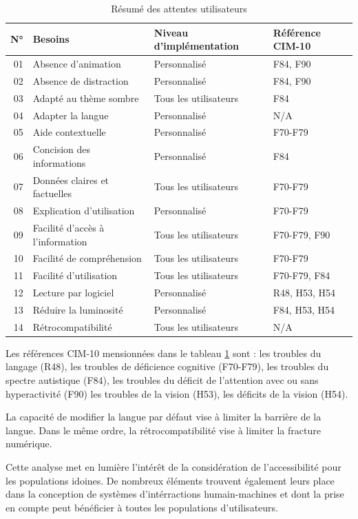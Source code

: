 \documentclass[a4paper,12pt]{article}
\begin{document}
\begin{multicols}{2}
\begin{table}[htbp]
\caption{\label{tab:orgfa4da91}Résumé des attentes utilisateurs}
\centering
\begin{tabular}{rlll}
N° & Besoins & Niveau d'implémentation & Référence CIM-10\\
\hline
01 & Absence d'animation & Personnalisé & F84, F90\\
02 & Absence de distraction & Personnalisé & F84, F90\\
03 & Adapté au thème sombre & Tous les utilisateurs & F84\\
04 & Adapter la langue & Personnalisé & N/A\\
05 & Aide contextuelle & Personnalisé & F70-F79\\
06 & Concision des informations & Personnalisé & F84\\
07 & Données claires et factuelles & Tous les utilisateurs & F70-F79\\
08 & Explication d'utilisation & Personnalisé & F70-F79\\
09 & Facilité d'accès à l'information & Tous les utilisateurs & F70-F79, F90\\
10 & Facilité de compréhension & Tous les utilisateurs & F70-F79\\
11 & Facilité d'utilisation & Tous les utilisateurs & F70-F79, F84\\
12 & Lecture par logiciel & Personnalisé & R48, H53, H54\\
13 & Réduire la luminosité & Personnalisé & F84, H53, H54\\
14 & Rétrocompatibilité & Tous les utilisateurs & N/A\\
\end{tabular}
\end{table}

Les références CIM-10 mensionnées dans le tableau \ref{tab:orgfa4da91} sont : les troubles du langage (R48), les troubles de déficience cognitive (F70-F79), les troubles du spectre autistique (F84), les troubles du déficit de l'attention avec ou sans hyperactivité (F90)  les troubles de la vision (H53), les déficits de la vision (H54).

La capacité de modifier la langue par défaut vise à limiter la barrière de la langue. Dans le même ordre, la rétrocompatibilité vise à limiter la fracture numérique.

Cette analyse met en lumière l'intérêt de la considération de l'accessibilité pour les populations idoines. De nombreux éléments trouvent également  leurs place dans la conception de systèmes d'intérractions humain-machines et dont la prise en compte peut bénéficier à toutes les populations d'utilisateurs.

\end{multicols}
\end{document}
